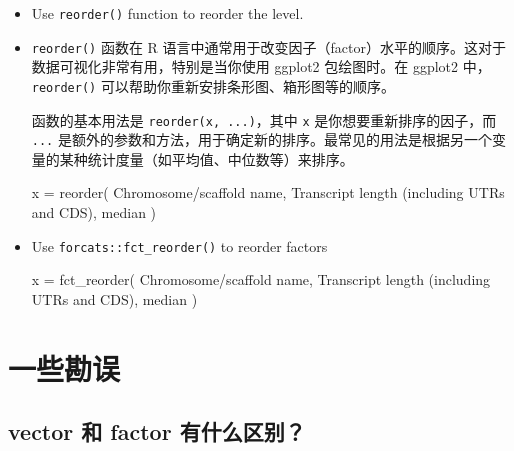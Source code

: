 \documentclass[
]{article}
\newenvironment{Shaded}{}{}
\newcommand{\AttributeTok}[1]{\textcolor[rgb]{0.49,0.56,0.16}{#1}}
\newcommand{\FunctionTok}[1]{\textcolor[rgb]{0.02,0.16,0.49}{#1}}
\newcommand{\NormalTok}[1]{#1}
\newcommand{\OtherTok}[1]{\textcolor[rgb]{0.00,0.44,0.13}{#1}}
\newcommand{\StringTok}[1]{\textcolor[rgb]{0.25,0.44,0.63}{#1}}
\begin{document}
\begin{itemize}
\item
  Use \texttt{reorder()} function to reorder the level.
\item
  \texttt{reorder()} 函数在 R
  语言中通常用于改变因子（factor）水平的顺序。这对于数据可视化非常有用，特别是当你使用
  ggplot2 包绘图时。在 ggplot2 中，\texttt{reorder()}
  可以帮助你重新安排条形图、箱形图等的顺序。

  函数的基本用法是 \texttt{reorder(x,\ ...)}，其中 \texttt{x}
  是你想要重新排序的因子，而 \texttt{...}
  是额外的参数和方法，用于确定新的排序。最常见的用法是根据另一个变量的某种统计度量（如平均值、中位数等）来排序。

\begin{Shaded}
\begin{Highlighting}[]
\NormalTok{x }\OtherTok{=} \FunctionTok{reorder}\NormalTok{( }
  \StringTok{\textasciigrave{}}\AttributeTok{Chromosome/scaffold name}\StringTok{\textasciigrave{}}\NormalTok{,}
  \StringTok{\textasciigrave{}}\AttributeTok{Transcript length (including UTRs and CDS)}\StringTok{\textasciigrave{}}\NormalTok{,}
\NormalTok{  median}
\NormalTok{)}
\end{Highlighting}
\end{Shaded}
\item
  Use \texttt{forcats::fct\_reorder()} to reorder factors

\begin{Shaded}
\begin{Highlighting}[]
\NormalTok{x }\OtherTok{=} \FunctionTok{fct\_reorder}\NormalTok{( }
  \StringTok{\textasciigrave{}}\AttributeTok{Chromosome/scaffold name}\StringTok{\textasciigrave{}}\NormalTok{,}
  \StringTok{\textasciigrave{}}\AttributeTok{Transcript length (including UTRs and CDS)}\StringTok{\textasciigrave{}}\NormalTok{,}
\NormalTok{  median }
\NormalTok{)}
\end{Highlighting}
\end{Shaded}
\end{itemize}

\hypertarget{ux4e00ux4e9bux52d8ux8bef}{%
\section{一些勘误}\label{ux4e00ux4e9bux52d8ux8bef}}

\hypertarget{vector-ux548c-factor-ux6709ux4ec0ux4e48ux533aux522b}{%
\subsection{vector 和 factor
有什么区别？}\label{vector-ux548c-factor-ux6709ux4ec0ux4e48ux533aux522b}}
\end{document}
